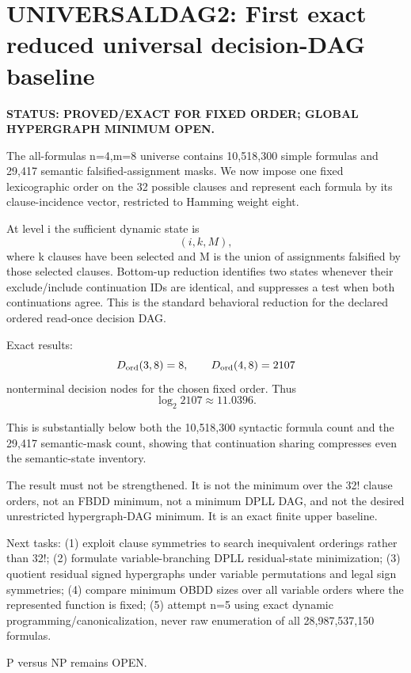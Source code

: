 \section*{UNIVERSALDAG2: First exact reduced universal decision-DAG baseline}
\textbf{STATUS: PROVED/EXACT FOR FIXED ORDER; GLOBAL HYPERGRAPH MINIMUM OPEN.}

The all-formulas n=4,m=8 universe contains 10,518,300 simple formulas and 29,417 semantic falsified-assignment masks. We now impose one fixed lexicographic order on the 32 possible clauses and represent each formula by its clause-incidence vector, restricted to Hamming weight eight.

At level i the sufficient dynamic state is
\[
(i,k,M),
\]
where k clauses have been selected and M is the union of assignments falsified by those selected clauses. Bottom-up reduction identifies two states whenever their exclude/include continuation IDs are identical, and suppresses a test when both continuations agree. This is the standard behavioral reduction for the declared ordered read-once decision DAG.

Exact results:
\[
D_{\rm ord}(3,8)=8,
\qquad
D_{\rm ord}(4,8)=2107
\]
nonterminal decision nodes for the chosen fixed order. Thus
\[
\log_2 2107\approx11.0396.
\]

This is substantially below both the 10,518,300 syntactic formula count and the 29,417 semantic-mask count, showing that continuation sharing compresses even the semantic-state inventory.

The result must not be strengthened. It is not the minimum over the 32! clause orders, not an FBDD minimum, not a minimum DPLL DAG, and not the desired unrestricted hypergraph-DAG minimum. It is an exact finite upper baseline.

Next tasks:
(1) exploit clause symmetries to search inequivalent orderings rather than 32!;
(2) formulate variable-branching DPLL residual-state minimization;
(3) quotient residual signed hypergraphs under variable permutations and legal sign symmetries;
(4) compare minimum OBDD sizes over all variable orders where the represented function is fixed;
(5) attempt n=5 using exact dynamic programming/canonicalization, never raw enumeration of all 28,987,537,150 formulas.

P versus NP remains OPEN.
